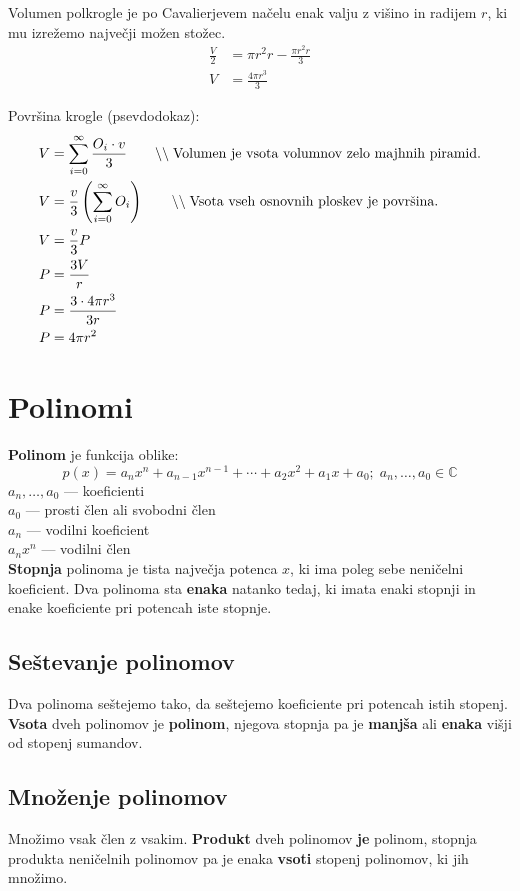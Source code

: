 \documentclass[a4paper,oneside,12pt,fleqn]{article}
\def\C{\ensuremath{\mathbb C}}
\newcommand\krat\cdot
\newcommand{\comment}[1]{\ensuremath{\qquad\backslash\backslash\;}\textnormal{#1}}
\numberwithin{equation}{section}
\begin{document}
Volumen polkrogle je po Cavalierjevem načelu enak valju z višino in radijem $r$, ki mu izrežemo
največji možen stožec.
\begin{align*}
  \frac{V}{2} &= \pi r^2 r - \frac{\pi r^2 r}{3} \\
  V &= \frac{4 \pi r^3}{3} 
\end{align*}

Površina krogle (psevdodokaz):
\begin{align*}
  V &= \sum_{i = 0}^{\infty} \frac{O_i \krat v}{3} \comment{Volumen je vsota volumnov zelo
  majhnih piramid.} \\
  V &= \frac{v}{3}\left( \sum_{i=0}^{\infty} O_i \right) \comment{Vsota vseh osnovnih
  ploskev je površina.} \\
  V &= \frac{v}{3}P \\
  P &= \frac{3V}{r} \\
  P &= \frac{3 \krat 4\pi r^3}{3r} \\
  P &= 4\pi r^2
\end{align*}


\section{Polinomi}
\label{sec:pol}
\textbf{Polinom} je funkcija oblike:
\[ p(x) = a_nx^n+a_{n-1}x^{n-1}+\cdots+a_2x^2+a_1x+a_0; \; a_n,\ldots,a_0 \in \C \]
$a_n,\ldots,a_0$ --- koeficienti \\
$a_0$ --- prosti člen ali svobodni člen \\
$a_n$ --- vodilni koeficient \\
$a_nx^n$ --- vodilni člen \\

\textbf{Stopnja} polinoma je tista največja potenca $x$, ki ima poleg sebe neničelni
koeficient. Dva polinoma sta \textbf{enaka} natanko tedaj, ki imata enaki stopnji in enake
koeficiente pri potencah iste stopnje.

\subsection{Seštevanje polinomov}
\label{sec:pol:ses}
Dva polinoma seštejemo tako, da seštejemo koeficiente pri potencah istih stopenj.
\textbf{Vsota} dveh polinomov je \textbf{polinom}, njegova stopnja pa je \textbf{manjša}
ali \textbf{enaka} višji od stopenj sumandov.

\subsection{Množenje polinomov}
\label{sec:pol:mnoz}
Množimo vsak člen z vsakim.
\textbf{Produkt} dveh polinomov \textbf{je} polinom, stopnja produkta neničelnih polinomov pa je enaka
\textbf{vsoti} stopenj polinomov, ki jih množimo.
\end{document}
